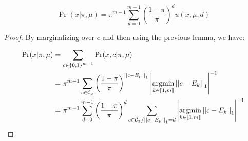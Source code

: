 \begin{thm}
    \label{thm:p_x_knowing_pi_mu}
    \[\Pr(x | \pi, \mu) = \pi^{m-1} \sum_{d = 0}^{m-1} \left(\frac{1 - \pi}{\pi}\right)^d u(x, \mu, d)\]
\end{thm}
\begin{proof}
    By marginalizing over $c$ and then using the previous lemma, we have:

\begin{align}
    \Pr(x | \pi, \mu)
    &= \sum_{c \in \left\{ 0, 1 \right\}^{m-1}} \Pr(x, c | \pi, \mu)\\
    &= \pi^{m-1} \sum_{c \in \mathcal{C}_x} \left(\frac{1 - \pi}{\pi}\right)^{\left|\left|c - E_{\mu}\right|\right|_1} \left|\operatorname*{argmin}_{k \in \left\llbracket1, m\right\rrbracket} \left|\left|c - E_k\right|\right|_1\right|^{-1}\\
    &= \pi^{m-1} \sum_{d = 0}^{m-1} \left(\frac{1 - \pi}{\pi}\right)^d \sum_{c \in \mathcal{C}_x / \left|\left|c - E_{\mu}\right|\right|_1 = d}  \left|\operatorname*{argmin}_{k \in \left\llbracket1, m\right\rrbracket} \left|\left|c - E_k\right|\right|_1\right|^{-1}
\end{align}
\end{proof}



